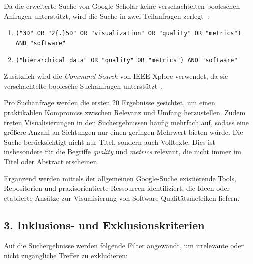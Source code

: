 Da die erweiterte Suche von Google Scholar keine verschachtelten booleschen Anfragen unterstützt, wird die Suche in zwei Teilanfragen zerlegt~\cite{scholar_queries_2023}:
\begin{enumerate}
    \item \verb|("3D" OR "2{.}5D" OR "visualization" OR "quality" OR "metrics")|\\
     \verb|AND "software"|
    \item \verb|("hierarchical data" OR "quality" OR "metrics") AND "software"|
\end{enumerate}
Zusätzlich wird die \textit{Command Search} von IEEE Xplore verwendet, da sie verschachtelte boolesche Suchanfragen unterstützt~\cite{ieee_xplore_boolean_2025}.

Pro Suchanfrage werden die ersten 20 Ergebnisse gesichtet, um einen praktikablen Kompromiss zwischen Relevanz und Umfang herzustellen. Zudem treten Visualisierungen in den Suchergebnissen häufig mehrfach auf, sodass eine größere Anzahl an Sichtungen nur einen geringen Mehrwert bieten würde. Die Suche berücksichtigt nicht nur Titel, sondern auch Volltexte. Dies ist insbesondere für die Begriffe \textit{quality} und \textit{metrics} relevant, die nicht immer im Titel oder Abstract erscheinen.

Ergänzend werden mittels der allgemeinen Google-Suche existierende Tools, Repositorien und praxisorientierte Ressourcen identifiziert, die Ideen oder etablierte Ansätze zur Visualisierung von Software-Qualitätsmetriken liefern.

\subsection*{3. Inklusions- und Exklusionskriterien} \label{sec:InklusionExklusionKriterien}
Auf die Suchergebnisse werden folgende Filter angewandt, um irrelevante oder nicht zugängliche Treffer zu exkludieren:

